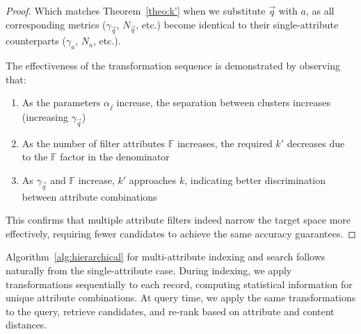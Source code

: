 \documentclass[numbers,sort]{article}
\begin{document}
\begin{proof}
Which matches Theorem~\ref{theo:k'} when we substitute $\vec{q}$ with $a$, as all corresponding metrics ($\gamma_{\vec{q}}$, $N_{\vec{q}}$, etc.) become identical to their single-attribute counterparts ($\gamma_a$, $N_a$, etc.).

The effectiveness of the transformation sequence is demonstrated by observing that:
\begin{enumerate}
\item As the parameters $\alpha_j$ increase, the separation between clusters increases (increasing $\gamma_{\vec{q}}$)
\item As the number of filter attributes $\mathbb{F}$ increases, the required $k'$ decreases due to the $\mathbb{F}$ factor in the denominator
\item As $\gamma_{\vec{q}}$ and $\mathbb{F}$ increase, $k'$ approaches $k$, indicating better discrimination between attribute combinations
\end{enumerate}

This confirms that multiple attribute filters indeed narrow the target space more effectively, requiring fewer candidates to achieve the same accuracy guarantees.
\end{proof}
Algorithm~\ref{alg:hierarchical} for multi-attribute indexing and search follows naturally from the single-attribute case. During indexing, we apply transformations sequentially to each record, computing statistical information for unique attribute combinations. At query time, we apply the same transformations to the query, retrieve candidates, and re-rank based on attribute and content distances.
\end{document}
